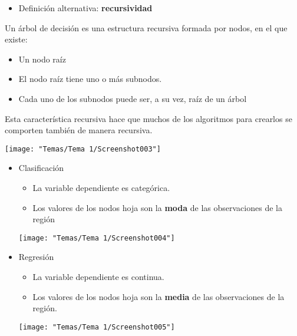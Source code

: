 \begin{itemize}[label=\color{red}\textbullet, leftmargin=*]
	\item \color{lightblue}Definición alternativa: \textbf{recursividad}
\end{itemize}
Un árbol de decisión es una estructura recursiva formada por nodos, en el que existe:
\begin{itemize}
	\item Un nodo raíz
	\item El nodo raíz tiene uno o más subnodos.
	\item Cada uno de los subnodos puede ser, a su vez, raíz de un árbol
\end{itemize}
Esta característica recursiva hace que muchos de los algoritmos para crearlos se comporten también de manera recursiva.
\begin{center}
	\texttt{[image: "Temas/Tema 1/Screenshot003"]}
\end{center}
\begin{itemize}[label=\color{lightblue}\textbullet]
	\item Clasificación
	\begin{itemize}
		\item La variable dependiente es categórica.
		\item Los valores de los nodos hoja son la \textbf{moda} de las observaciones de la región
	\end{itemize}
	\begin{center}
		\texttt{[image: "Temas/Tema 1/Screenshot004"]}
	\end{center}
	\item Regresión
	\begin{itemize}
		\item La variable dependiente es continua.
		\item Los valores de los nodos hoja son la \textbf{media} de las observaciones de la región.
	\end{itemize}
	\begin{center}
		\texttt{[image: "Temas/Tema 1/Screenshot005"]}
	\end{center}
	
\end{itemize}

